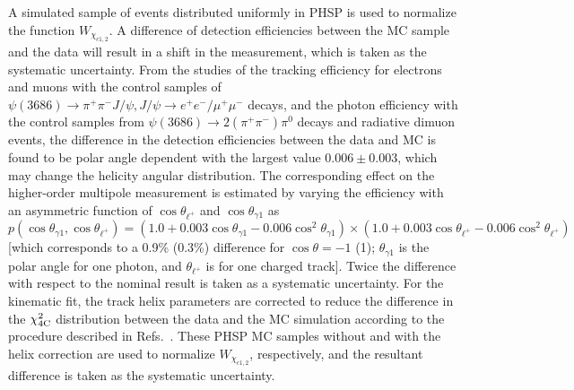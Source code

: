 \documentclass[prd,twocolumn,showpacs,amsmath,amssymb]{revtex4-1}
\begin{document}
A simulated sample of events distributed uniformly in {\sc PHSP} is used to normalize the function $W_{\chi_{c1,2}}$. A difference of detection efficiencies between the MC sample and the data will result in a shift in the measurement, which is taken as the systematic uncertainty.
From the studies of the tracking efficiency for electrons and muons with the control samples of
$\psi(3686)\rightarrow\pi^{+}\pi^{-}J/\psi, J/\psi\rightarrow e^{+}e^{-}/\mu^{+}\mu^{-}$ decays, and the photon efficiency with the
control samples from $\psi(3686)\rightarrow 2(\pi^{+}\pi^{-})\pi^{0}$ decays and radiative dimuon events, the difference in the detection
efficiencies between the data and MC is found to be polar angle dependent with the largest value $0.006\pm0.003$, which may change the helicity angular distribution.
The corresponding effect on the higher-order multipole measurement is estimated by varying the efficiency with an asymmetric function of $\cos\theta_{\ell^+}$ and $\cos\theta_{\gamma1}$ as $p(\cos\theta_{\gamma1},\cos\theta_{\ell^{+}})=(1.0+0.003\cos\theta_{\gamma1}-0.006\cos^{2}\theta_{\gamma1})
\times(1.0+0.003\cos\theta_{\ell^{+}}-0.006\cos^{2}\theta_{\ell^{+}})$ [which corresponds to a 0.9\% (0.3\%) difference for $\cos\theta = -1$ (1);
$\theta_{\gamma1}$ is the polar angle for one photon, and $\theta_{\ell^{+}}$ is for one charged track].
Twice the difference with respect to the nominal result is taken as a systematic uncertainty.
For the kinematic fit, the track helix parameters are corrected to reduce the difference in the $\chi_{4\rm C}^{2}$ distribution between the data and
the MC simulation according to the procedure described in Refs.~\cite{GYP,WZHH}. These {\sc PHSP} MC samples without and with the helix correction are used to
normalize $W_{\chi_{c1,2}}$, respectively, and the resultant difference is taken as the systematic uncertainty.
\end{document}

